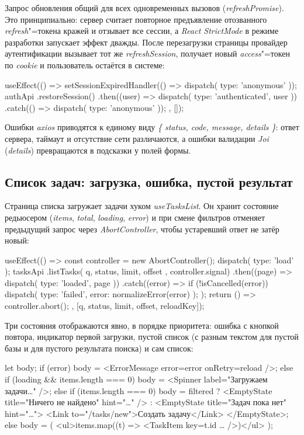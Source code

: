 \documentclass{stp}
\newcommand{\en}[1]{\textit{#1}}
\begin{document}
Запрос обновления общий для всех одновременных вызовов
(\en{refreshPromise}). Это принципиально: сервер считает повторное
предъявление отозванного \en{refresh}"=токена кражей и отзывает все сессии, а
\en{React StrictMode} в режиме разработки запускает эффект дважды. После
перезагрузки страницы провайдер аутентификации вызывает тот же
\en{refreshSession}, получает новый \en{access}"=токен по \en{cookie} и
пользователь остаётся в системе:

\begin{stplisting}
useEffect(() => {
  setSessionExpiredHandler(() => dispatch({ type: 'anonymous' }));
  authApi
    .restoreSession()
    .then((user) => dispatch({ type: 'authenticated', user }))
    .catch(() => dispatch({ type: 'anonymous' }));
}, []);
\end{stplisting}

Ошибки \en{axios} приводятся к единому виду \en{\{ status, code, message,
details \}}: ответ сервера, таймаут и отсутствие сети различаются, а ошибки
валидации \en{Joi} (\en{details}) превращаются в подсказки у полей формы.

\subsection{Список задач: загрузка, ошибка, пустой результат}

Страница списка загружает задачи хуком \en{useTasksList}. Он хранит
состояние редьюсером (\en{items}, \en{total}, \en{loading}, \en{error}) и
при смене фильтров отменяет предыдущий запрос через \en{AbortController},
чтобы устаревший ответ не затёр новый:

\begin{stplisting}
useEffect(() => {
  const controller = new AbortController();
  dispatch({ type: 'load' });
  tasksApi
    .listTasks({ q, status, limit, offset }, controller.signal)
    .then((page) => dispatch({ type: 'loaded', page }))
    .catch((error) => {
      if (!isCancelled(error)) {
        dispatch({ type: 'failed', error: normalizeError(error) });
      }
    });
  return () => controller.abort();
}, [q, status, limit, offset, reloadKey]);
\end{stplisting}

Три состояния отображаются явно, в порядке приоритета: ошибка с кнопкой
повтора, индикатор первой загрузки, пустой список (с разным текстом для
пустой базы и для пустого результата поиска) и сам список:

\begin{stplisting}
let body;
if (error) {
  body = <ErrorMessage error={error} onRetry={reload} />;
} else if (loading && items.length === 0) {
  body = <Spinner label="Загружаем задачи…" />;
} else if (items.length === 0) {
  body = filtered
    ? <EmptyState title="Ничего не найдено" hint="…" />
    : <EmptyState title="Задач пока нет" hint="…">
        <Link to="/tasks/new">Создать задачу</Link>
      </EmptyState>;
} else {
  body = (
    <ul>{items.map((t) => <TaskItem key={t.id} … />)}</ul>
  );
}
\end{stplisting}
\end{document}
